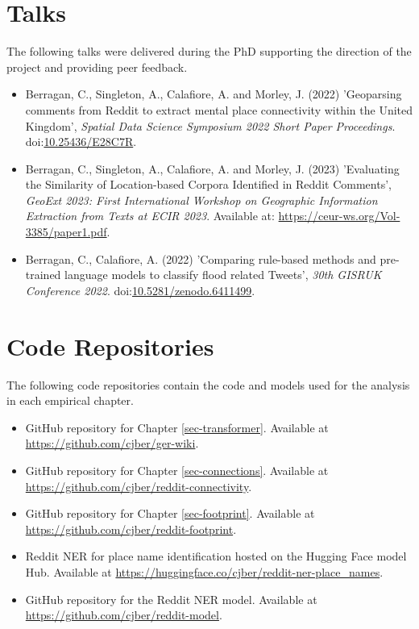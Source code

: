 \section*{Talks}

The following talks were delivered during the PhD supporting the direction of the project and providing peer feedback.

\begin{itemize}
  \item Berragan, C., Singleton, A., Calafiore, A. and Morley, J. (2022) 'Geoparsing comments from Reddit to extract mental place connectivity within the United Kingdom', \textit{Spatial Data Science Symposium 2022 Short Paper Proceedings}. doi:\href{https://doi.org/10.25436/E28C7R}{10.25436/E28C7R}.

  \item Berragan, C., Singleton, A., Calafiore, A. and Morley, J. (2023) 'Evaluating the Similarity of Location-based Corpora Identified in Reddit Comments', \textit{GeoExt 2023: First International Workshop on Geographic Information Extraction from Texts at ECIR 2023}. Available at: \href{https://ceur-ws.org/Vol-3385/paper1.pdf}{https://ceur-ws.org/Vol-3385/paper1.pdf}.

  \item Berragan, C., Calafiore, A. (2022) 'Comparing rule-based methods and pre-trained language models to classify flood related Tweets', \textit{30th GISRUK Conference 2022}. doi:\href{https://doi.org/10.5281/zenodo.6411499}{10.5281/zenodo.6411499}.
\end{itemize}

\section*{Code Repositories}

The following code repositories contain the code and models used for the analysis in each empirical chapter.

\begin{itemize}
  \item GitHub repository for Chapter \ref{sec-transformer}. Available at \url{https://github.com/cjber/ger-wiki}.
  \item GitHub repository for Chapter \ref{sec-connections}. Available at \url{https://github.com/cjber/reddit-connectivity}.
  \item GitHub repository for Chapter \ref{sec-footprint}. Available at \url{https://github.com/cjber/reddit-footprint}.
  \item Reddit NER for place name identification hosted on the Hugging Face model Hub. Available at \url{https://huggingface.co/cjber/reddit-ner-place\_names}.
  \item GitHub repository for the Reddit NER model. Available at \url{https://github.com/cjber/reddit-model}.
\end{itemize}
